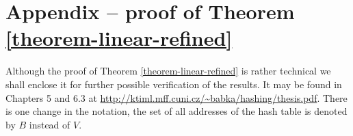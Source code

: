 \section*{Appendix -- proof of Theorem \ref{theorem-linear-refined}}

Although the proof of Theorem \ref{theorem-linear-refined} is rather technical we shall enclose it for further possible verification of the results. It may be found in Chapters 5 and 6.3 at \url{http://ktiml.mff.cuni.cz/~babka/hashing/thesis.pdf}. There is one change in the notation, the set of all addresses of the hash table is denoted by $B$ instead of $V$.
